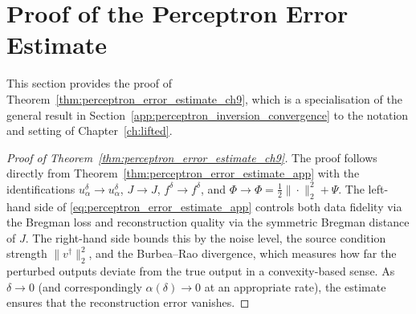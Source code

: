 \section{Proof of the Perceptron Error Estimate}\label{app:proof_perceptron_error_estimate_ch9}

This section provides the proof of Theorem~\ref{thm:perceptron_error_estimate_ch9}, which is a specialisation of the general result in Section~\ref{app:perceptron_inversion_convergence} to the notation and setting of Chapter~\ref{ch:lifted}.

\begin{proof}[Proof of Theorem~\ref{thm:perceptron_error_estimate_ch9}]
The proof follows directly from Theorem~\ref{thm:perceptron_error_estimate_app} with the identifications $u_\alpha^\delta \to u_\alpha^\delta$, $J \to J$, $f^\delta \to f^\delta$, and $\Phi \to \Phi = \frac{1}{2}\|\cdot\|_2^2 + \Psi$. The left-hand side of \eqref{eq:perceptron_error_estimate_app} controls both data fidelity via the Bregman loss and reconstruction quality via the symmetric Bregman distance of $J$. The right-hand side bounds this by the noise level, the source condition strength $\|v^\dagger\|_2^2$, and the Burbea--Rao divergence, which measures how far the perturbed outputs deviate from the true output in a convexity-based sense. As $\delta \to 0$ (and correspondingly $\alpha(\delta) \to 0$ at an appropriate rate), the estimate ensures that the reconstruction error vanishes.
\end{proof}